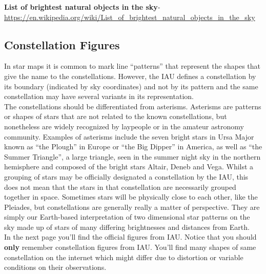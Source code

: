 \documentclass[a4paper,12pt]{extarticle}
\begin{document}
\textbf{List of brightest natural objects in the sky}- \url{https://en.wikipedia.org/wiki/List_of_brightest_natural_objects_in_the_sky}
\subsection{Constellation Figures}

In star maps it is common to mark line “patterns” that represent the shapes that give the name to the constellations. However, the IAU defines a constellation by its boundary (indicated by sky coordinates) and not by its pattern and the same constellation may have several variants in its representation.\\

The constellations should be differentiated from asterisms. Asterisms are patterns or shapes of stars that are not related to the known constellations, but nonetheless are widely recognized by laypeople or in the amateur astronomy community. Examples of asterisms include the seven bright stars in Ursa Major known as “the Plough” in Europe or “the Big Dipper” in America, as well as “the Summer Triangle”, a large triangle, seen in the summer night sky in the northern hemisphere and composed of the bright stars Altair, Deneb and Vega. Whilst a grouping of stars may be officially designated a constellation by the IAU, this does not mean that the stars in that constellation are necessarily grouped together in space. Sometimes stars will be physically close to each other, like the Pleiades, but constellations are generally really a matter of perspective. They are simply our Earth-based interpretation of two dimensional star patterns on the sky made up of stars of many differing brightnesses and distances from Earth.\\

In the next page you'll find the official figures from IAU. Notice that you should \textbf{only} remember constellation figures from IAU. You'll find many shapes of same constellation on the internet which might differ due to distortion or variable conditions on their observations. 
\end{document}
